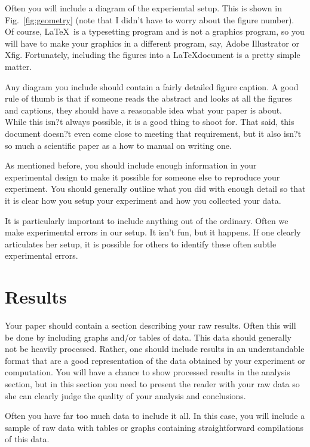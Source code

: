 \documentclass[preprint,pre,floats,aps,amsmath,amssymb]{revtex4}
\begin{document}
Often you will include a diagram of the experiemtal setup.  This is
shown in Fig.~\ref{fig:geometry} (note that I didn't have to worry
about the figure number).  Of course, \LaTeX\ is a typesetting program
and is not a graphics program, so you will have to make your graphics
in a different program, say, Adobe Illustrator or Xfig.  Fortunately,
including the figures into a \LaTeX document is a pretty simple
matter.



Any diagram you include should contain a fairly detailed figure
caption.  A good rule of thumb is that if someone reads the abstract
and looks at all the figures and captions, they should have a
reasonable idea what your paper is about.  While this isn?t always
possible, it is a good thing to shoot for.  That said, this document
doesn?t even come close to meeting that requirement, but it also isn?t
so much a scientific paper as a how to manual on writing one.

As mentioned before, you should include enough information in your
experimental design to make it possible for someone else to reproduce
your experiment.  You should generally outline what you did with
enough detail so that it is clear how you setup your experiment and
how you collected your data.  

It is particularly important to include anything out of the ordinary.
Often we make experimental errors in our setup.  It isn't fun, but it
happens.  If one clearly articulates her setup, it is possible for
others to identify these often subtle experimental errors.

\section{Results}
\label{sec:results}

Your paper should contain a section describing your raw results. 
Often this will be done by including graphs and/or tables of data. 
This data should generally not be heavily processed.  Rather, one
should include results in an understandable format that are a good
representation of the data obtained by your experiment or computation.
 You will have a chance to show processed results in the analysis
section, but in this section you need to present the reader with your
raw data so she can clearly judge the quality of your analysis and
conclusions. 

Often you have far too much data to include it all.  In this case, you
will include a sample of raw data with tables or graphs containing
straightforward compilations of this data. 
\end{document}
